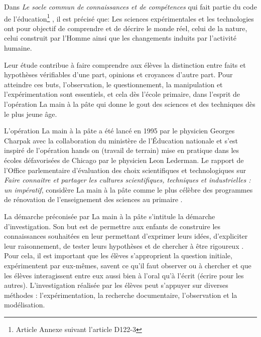 Dans \textit{Le socle commun de connaissances et de compétences} \cite[p.~12]{Socle} qui fait partie du code de l’éducation\footnote{Article Annexe suivant l’article D122-3} , il est précisé que: 
Les sciences expérimentales et les technologies ont pour objectif de comprendre et de décrire le monde réel, celui de la nature, celui construit par l’Homme ainsi que les changements induits par l’activité humaine.

Leur étude contribue à faire comprendre aux élèves la distinction entre faits et hypothèses vérifiables d’une part, opinions et croyances d’autre part. Pour atteindre ces buts, l’observation, le questionnement, la manipulation et l’expérimentation sont essentiels, et cela dès l’école primaire, dans l’esprit de l’opération \og La main à la pâte \fg{} qui donne le gout des sciences et des techniques dès le plus jeune âge.

L’opération \og La main à la pâte \fg{} a été lancé en 1995 par le physicien Georges Charpak avec la collaboration du ministère de l’Éducation nationale et s’est inspiré de l’opération \og hands on \fg{} (travail de terrain) mise en pratique dans les écoles défavorisées de Chicago par le physicien Leon Lederman. Le rapport de l’Office parlementaire d’évaluation des choix scientifiques et technologiques sur \emph{Faire connaitre et partager les cultures scientifiques, techniques et industrielles : un impératif}, considère \og La main à la pâte \fg{} comme le plus célèbre des programmes de rénovation de l’enseignement des sciences au primaire \cite{Olivier2014}.

La démarche préconisée par \og La main à la pâte \fg{} s’intitule la démarche d’investigation. Son but est de \og permettre aux enfants de construire les connaissances souhaitées en leur permettant d’exprimer leurs idées, d’expliciter leur raisonnement, de tester leurs hypothèses et de chercher à être rigoureux \fg{} \cite[p.~9]{Saltiel2005}. Pour cela, il est important que les élèves s’approprient la question initiale, expérimentent par eux-mêmes, savent ce qu’il faut observer ou à chercher et que les élèves interagissent entre eux aussi bien à l’oral qu’à l’écrit (écrire pour les autres). L’investigation réalisée par les élèves peut s’appuyer sur diverses méthodes : l’expérimentation, la recherche documentaire, l’observation et la modélisation.

